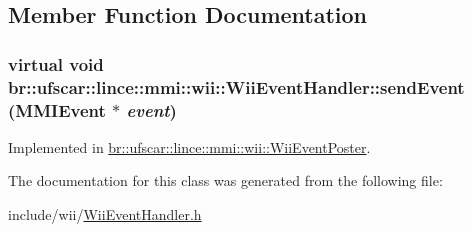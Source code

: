 \subsection{Member Function Documentation}
\hypertarget{classbr_1_1ufscar_1_1lince_1_1mmi_1_1wii_1_1WiiEventHandler_a7e94bf7dc7fa2dd0552ff2c97faf9f41}{
\subsubsection[{sendEvent}]{\setlength{\rightskip}{0pt plus 5cm}virtual void br::ufscar::lince::mmi::wii::WiiEventHandler::sendEvent ({\bf MMIEvent} $\ast$ {\em event})}}
\label{classbr_1_1ufscar_1_1lince_1_1mmi_1_1wii_1_1WiiEventHandler_a7e94bf7dc7fa2dd0552ff2c97faf9f41}


Implemented in \hyperlink{classbr_1_1ufscar_1_1lince_1_1mmi_1_1wii_1_1WiiEventPoster_a5e1eb67b8afb4324be1899a043ee92c4}{br::ufscar::lince::mmi::wii::WiiEventPoster}.



The documentation for this class was generated from the following file:\begin{DoxyCompactItemize}
\item 
include/wii/\hyperlink{WiiEventHandler_8h}{WiiEventHandler.h}\end{DoxyCompactItemize}
